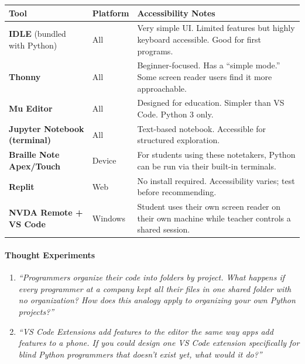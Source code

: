 \documentclass[
  justified,
  openright,
]{tufte-book}
\let\paragraph\paragraph
\let\paragraph\paragraph
\begin{document}
{\def\LTcaptype{none} %
\begin{longtable}[]{@{}
  >{\raggedright\arraybackslash}p{}
  >{\raggedright\arraybackslash}p{}
  >{\raggedright\arraybackslash}p{}@{}}
\toprule\noalign{}
\begin{minipage}[b]{\linewidth}\raggedright
Tool
\end{minipage} & \begin{minipage}[b]{\linewidth}\raggedright
Platform
\end{minipage} & \begin{minipage}[b]{\linewidth}\raggedright
Accessibility Notes
\end{minipage} \\
\midrule\noalign{}
\endhead
\bottomrule\noalign{}
\endlastfoot
\textbf{IDLE} (bundled with Python) & All & Very simple UI. Limited
features but highly keyboard accessible. Good for first programs. \\
\textbf{Thonny} & All & Beginner-focused. Has a ``simple mode.'' Some
screen reader users find it more approachable. \\
\textbf{Mu Editor} & All & Designed for education. Simpler than VS Code.
Python 3 only. \\
\textbf{Jupyter Notebook (terminal)} & All & Text-based notebook.
Accessible for structured exploration. \\
\textbf{Braille Note Apex/Touch} & Device & For students using these
notetakers, Python can be run via their built-in terminals. \\
\textbf{Replit} & Web & No install required. Accessibility varies; test
before recommending. \\
\textbf{NVDA Remote + VS Code} & Windows & Student uses their own screen
reader on their own machine while teacher controls a shared session. \\
\end{longtable}
}

\paragraph{Thought Experiments}\label{thought-experiments-2}

\begin{enumerate}
\def\labelenumi{\arabic{enumi}.}
\item
  \emph{``Programmers organize their code into folders by project. What
  happens if every programmer at a company kept all their files in one
  shared folder with no organization? How does this analogy apply to
  organizing your own Python projects?''}
\item
  \emph{``VS Code Extensions add features to the editor the same way
  apps add features to a phone. If you could design one VS Code
  extension specifically for blind Python programmers that doesn't exist
  yet, what would it do?''}
\end{enumerate}
\end{document}
